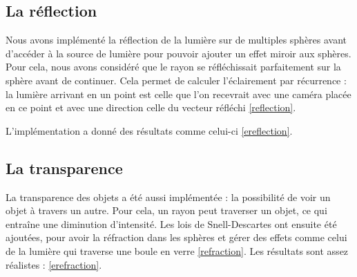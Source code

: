 \subsection{La réflection}
Nous avons implémenté la réflection de la lumière sur de multiples sphères avant d'accéder à la source de lumière pour pouvoir ajouter un effet miroir aux sphères. Pour cela, nous avons considéré que le rayon se réfléchissait parfaitement sur la sphère avant de continuer. Cela permet de calculer l'éclairement par récurrence : la lumière arrivant en un point est celle que l'on recevrait avec une caméra placée en ce point et avec une direction celle du vecteur réfléchi \ref{reflection}.

L'implémentation a donné des résultats comme celui-ci \ref{ereflection}.

\subsection{La transparence}
  La transparence des objets a été aussi implémentée : la possibilité de voir un objet à travers un autre. Pour cela, un rayon peut traverser un objet, ce qui entraîne une diminution d'intensité. Les lois de Snell-Descartes ont ensuite été ajoutées, pour avoir la réfraction dans les sphères et gérer des effets comme celui de la lumière qui traverse une boule en verre \ref{refraction}.
Les résultats sont assez réalistes :  \ref{erefraction}.
